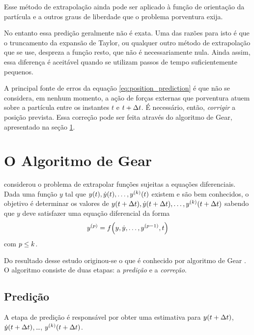 Esse método de extrapolação ainda pode ser aplicado à função de orientação da partícula e a outros graus de liberdade que o problema porventura exija.

No entanto essa predição geralmente não é exata. Uma das razões para isto é que o truncamento da expansão de Taylor, ou qualquer outro método de extrapolação que se use, despreza a função resto, que não é necessariamente nula. Ainda assim, essa diferença é aceitável quando se utilizam passos de tempo suficientemente pequenos. 

A principal fonte de erros da equação \eqref{eq:position_prediction} é que não se considera, em nenhum momento, a ação de forças externas que porventura atuem sobre a partícula entre os instantes \(t\) e \(t + \Delta t\). É necessário, então, \textit{corrigir} a posição prevista. Essa correção pode ser feita através do algoritmo de Gear, apresentado na seção \ref{sec:gear_integration_scheme}.

\section{O Algoritmo de Gear} \label{sec:gear_integration_scheme}

 considerou o problema de extrapolar funções sujeitas a equações diferenciais. Dada uma função \(y\) tal que \(y(t), \deriv{1}{y}(t),\dots, \deriv{\taylorOrder}{y}(t)\) existem e são bem conhecidos, o objetivo é determinar os valores de \(y(t + \Dt), \deriv{1}{y}(t + \Dt),\dots, \deriv{\taylorOrder}{y}(t + \Dt)\) sabendo que \(y\) deve satisfazer uma equação diferencial da forma
\begin{equation} \label{eq:gear_diff}
	\deriv{\eqOrder}{y} = f\pqty{y, \deriv{1}{y},\dots,\deriv{\eqOrder-1}{y}, t}
\end{equation}
com \(p \leq k\).

Do resultado desse estudo originou-se o que é conhecido por algoritmo de Gear . O algoritmo consiste de duas etapas: a \textit{predição} e a \textit{correção}.

\subsection{Predição}

A etapa de predição é responsável por obter uma estimativa para \(y(t + \Delta t)\), \(\deriv{1}{y}(t + \Dt)\),\,\dots, \(\deriv{\taylorOrder}{y}(t + \Dt)\).

